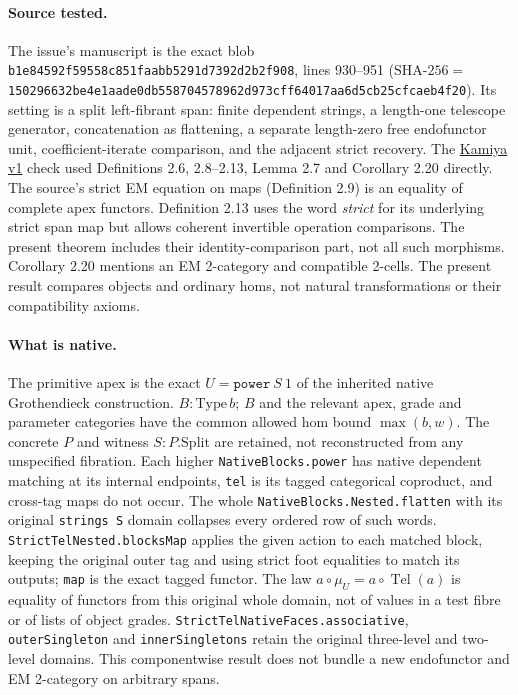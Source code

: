\documentclass[11pt]{article}
\newcommand{\Tel}{\operatorname{Tel}}
\newcommand{\code}[1]{\texttt{#1}}
\begin{document}
\paragraph{Source tested.}
The issue's manuscript is the exact blob \code{b1e84592f59558c851faabb5291d7392d2b2f908}, lines 930--951 (\(\mathrm{SHA}\text{-}256=\)\texttt{150296632be4e1aade0db558704578962d973cff64017aa6d5cb25cfcaeb4f20}). Its setting is a split left-fibrant span: finite dependent strings, a length-one telescope generator, concatenation as flattening, a separate length-zero free endofunctor unit, coefficient-iterate comparison, and the adjacent strict recovery. The \href{https://hexagonmath.org/pdf/2610.00302v1}{Kamiya v1} check used Definitions 2.6, 2.8--2.13, Lemma 2.7 and Corollary 2.20 directly. The source's strict EM equation on maps (Definition 2.9) is an equality of complete apex functors. Definition 2.13 uses the word \emph{strict} for its underlying strict span map but allows coherent invertible operation comparisons. The present theorem includes their identity-comparison part, not all such morphisms. Corollary 2.20 mentions an EM 2-category and compatible 2-cells. The present result compares objects and ordinary homs, not natural transformations or their compatibility axioms.

\paragraph{What is native.}
The primitive apex is the exact \(U=\code{power}\ S\ 1\) of the inherited native Grothendieck construction. \(B:\mathrm{Type}\,b\); \(B\) and the relevant apex, grade and parameter categories have the common allowed hom bound \(\max(b,w)\). The concrete \(P\) and witness \(S:P.\mathrm{Split}\) are retained, not reconstructed from any unspecified fibration. Each higher \code{NativeBlocks.power} has native dependent matching at its internal endpoints, \code{tel} is its tagged categorical coproduct, and cross-tag maps do not occur. The whole \code{NativeBlocks.Nested.flatten} with its original \code{strings S} domain collapses every ordered row of such words. \code{StrictTelNested.blocksMap} applies the given action to each matched block, keeping the original outer tag and using strict foot equalities to match its outputs; \code{map} is the exact tagged functor. The law \(a\circ\mu_U=a\circ\Tel(a)\) is equality of functors from this original whole domain, not of values in a test fibre or of lists of object grades. \code{StrictTelNativeFaces.associative}, \code{outerSingleton} and \code{innerSingletons} retain the original three-level and two-level domains. This componentwise result does not bundle a new endofunctor and EM 2-category on arbitrary spans.
\end{document}
